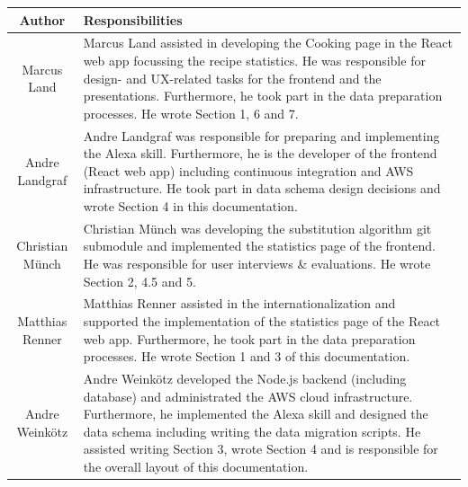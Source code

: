 \begin{table}[!h]
	\fontsize{9pt}{13pt}\selectfont
	\hspace{-5pt}
	\begin{tabularx}{\textwidth + 5pt}{| @{\hspace{3pt}} c | @{\hspace{3pt}} X |}
		\hline
		\textbf{Author} & \textbf{Responsibilities} \\
		\hline
		Marcus Land & Marcus Land assisted in developing the Cooking page in the React web app focussing the recipe statistics. He was responsible for design- and UX-related tasks for the frontend and the presentations. Furthermore, he took part in the data preparation processes. He wrote Section 1, 6 and 7.  \\
				\hline
		Andre Landgraf & Andre Landgraf was responsible for preparing and implementing the Alexa skill. Furthermore, he is the developer of the frontend (React web app) including continuous integration and AWS infrastructure. He took part in data schema design decisions and wrote Section 4 in this documentation.   \\
				\hline
		Christian Münch & Christian Münch was developing the substitution algorithm git submodule and implemented the statistics page of the frontend. He was responsible for user interviews \& evaluations. He wrote Section 2, 4.5 and 5. \\
				\hline
		Matthias Renner & Matthias Renner assisted in the internationalization and supported the implementation of the statistics page of the React web app. Furthermore, he took part in the data preparation processes. He wrote Section 1 and 3 of this documentation. \\
				\hline
		Andre Weinkötz & Andre Weinkötz developed the Node.js backend (including database) and administrated the AWS cloud infrastructure. Furthermore, he implemented the Alexa skill and designed the data schema including writing the data migration scripts. He assisted writing Section 3, wrote Section 4 and is responsible for the overall layout of this documentation. \\
		\hline
	\end{tabularx}
\end{table}

